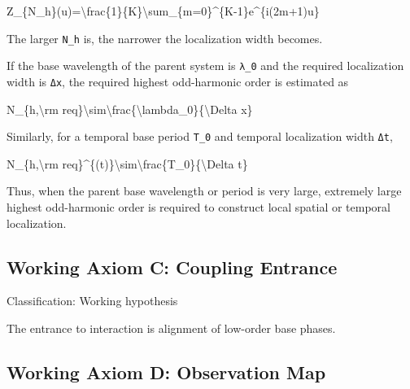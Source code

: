 \documentclass[
  a4paper]{article}
\newenvironment{Shaded}{}{}
\newcommand{\NormalTok}[1]{#1}
\begin{document}
\begin{Shaded}
\begin{Highlighting}[]
\NormalTok{Z\_\{N\_h\}(u)=\textbackslash{}frac\{1\}\{K\}\textbackslash{}sum\_\{m=0\}\^{}\{K{-}1\}e\^{}\{i(2m+1)u\}}
\end{Highlighting}
\end{Shaded}

The larger \texttt{N\_h} is, the narrower the localization width
becomes.

If the base wavelength of the parent system is \texttt{λ\_0} and the
required localization width is \texttt{Δx}, the required highest
odd-harmonic order is estimated as

\begin{Shaded}
\begin{Highlighting}[]
\NormalTok{N\_\{h,\textbackslash{}rm req\}\textbackslash{}sim\textbackslash{}frac\{\textbackslash{}lambda\_0\}\{\textbackslash{}Delta x\}}
\end{Highlighting}
\end{Shaded}

Similarly, for a temporal base period \texttt{T\_0} and temporal
localization width \texttt{Δt},

\begin{Shaded}
\begin{Highlighting}[]
\NormalTok{N\_\{h,\textbackslash{}rm req\}\^{}\{(t)\}\textbackslash{}sim\textbackslash{}frac\{T\_0\}\{\textbackslash{}Delta t\}}
\end{Highlighting}
\end{Shaded}

Thus, when the parent base wavelength or period is very large, extremely
large highest odd-harmonic order is required to construct local spatial
or temporal localization.

\subsection{Working Axiom C: Coupling
Entrance}\label{working-axiom-c-coupling-entrance}

Classification: Working hypothesis

The entrance to interaction is alignment of low-order base phases.

\subsection{Working Axiom D: Observation
Map}\label{working-axiom-d-observation-map}
\end{document}

